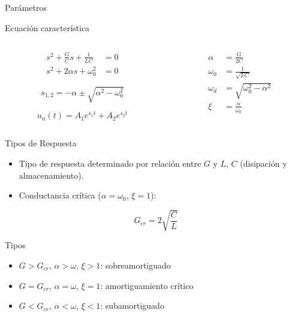 \documentclass[xcolor={usenames,svgnames,dvipsnames}]{beamer}
\begin{document}
\begin{frame}[label={sec:org4cc3100}]{Parámetros}
\begin{block}{Ecuación característica}
\begin{columns}
\begin{column}{.5\columnwidth}
\begin{align*}
s^2 + \frac{G}{C} s + \frac{1}{LC} &= 0\\
s^2 + 2\alpha s + \omega_0^2 &= 0  
\end{align*}

\[
  s_{1,2} = -\alpha \pm \sqrt{\alpha^2 - \omega_0^2}
\]

\[
  u_n(t) = A_1 e^{s_1 t} + A_2 e^{s_2 t}
\]
\end{column}
\begin{column}{.5\columnwidth}
\begin{align*}
  \alpha &= \frac{G}{2C}\\
  \omega_0 &= \frac{1}{\sqrt{LC}}\\
  \omega_d &= \sqrt{\omega_0^2 - \alpha^2}\\
  \xi &= \frac{\alpha}{\omega_0}
\end{align*}
\end{column}
\end{columns}
\end{block}
\end{frame}

\begin{frame}[label={sec:orgc405401}]{Tipos de Respuesta}
\begin{itemize}
\item Tipo de respuesta determinado por relación entre \(G\) y \(L\), \(C\) (disipación y almacenamiento).
\item Conductancia crítica (\(\alpha = \omega_0\), \(\xi = 1\)):
\end{itemize}

\[
  G_{cr} = 2\sqrt{\frac{C}{L}}
\]

\begin{block}{Tipos}
\begin{itemize}
\item \(G > G_{cr}\), \(\alpha > \omega\), \(\xi > 1\): \alert{sobreamortiguado}
\item \(G = G_{cr}\),  \(\alpha = \omega\), \(\xi = 1\): \alert{amortiguamiento crítico}
\item \(G < G_{cr}\),  \(\alpha < \omega\), \(\xi < 1\): \alert{subamortiguado}
\end{itemize}
\end{block}
\end{frame}
\end{document}
